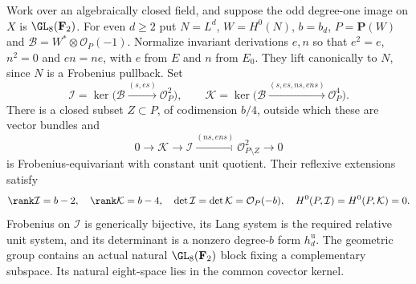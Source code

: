 \begin{lemma}
\label{lem:generic-mixed-image-block-candidate}
Work over an algebraically closed field, and suppose the odd
degree-one image on $X$ is $\GL_8(\mathbf F_2)$.
For even $d\ge2$ put $N=L^d$, $W=H^0(N)$, $b=b_d$,
$P=\mathbf P(W)$ and $\mathcal B=W^*\otimes\mathcal O_P(-1)$.
Normalize invariant derivations $e,n$ so that
$e^2=e$, $n^2=0$ and $en=ne$, with $e$ from $E$ and $n$ from
$E_0$. They lift canonically to $N$, since $N$ is a Frobenius
pullback. Set
\[
 \mathcal I=\ker\bigl(\mathcal B\xrightarrow{(s,es)}\mathcal O_P^2\bigr),
 \qquad
 \mathcal K=\ker\bigl(\mathcal B\xrightarrow{(s,es,ns,ens)}\mathcal O_P^4\bigr).
\]
There is a closed subset $Z\subset P$, of codimension $b/4$,
outside which these are vector bundles and
\[
 0\longrightarrow\mathcal K\longrightarrow\mathcal I
       \xrightarrow{(ns,ens)}\mathcal O_{P\setminus Z}^2
       \longrightarrow0
\]
is Frobenius-equivariant with constant unit quotient. Their
reflexive extensions satisfy
\[
 \rank\mathcal I=b-2,\quad\rank\mathcal K=b-4,\quad
 \det\mathcal I=\det\mathcal K=\mathcal O_P(-b),\quad
 H^0(P,\mathcal I)=H^0(P,\mathcal K)=0.
\]
Frobenius on $\mathcal I$ is generically bijective, its Lang
system is the required relative unit system, and its determinant
is a nonzero degree-$b$ form $h_d^{\mathrm u}$.
The geometric group contains an actual natural
$\GL_8(\mathbf F_2)$ block fixing a complementary subspace.
Its natural eight-space lies in the common covector kernel.
\end{lemma}

